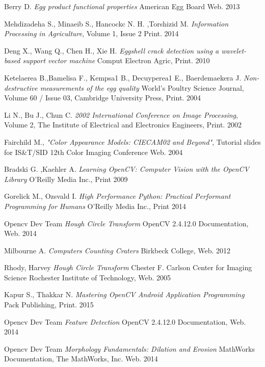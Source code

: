 \documentclass[12pt,twoside,a4paper]{article}
\begin{document}
\begin{thebibliography}{9}
 
Berry D.
\textit{Egg product functional properties} 
American Egg Board Web. 2013

Mehdizadeha S., Minaeib S., Hancockc N. H. ,Torshizid M.
\textit{Information Processing in Agriculture}, Volume 1, Issue 2 
Print. 2014

Deng X., Wang Q., Chen H., Xie H.
\textit{Eggshell crack detection using a wavelet-based support vector machine} Comput Electron Agric, Print. 2010

Ketelaerea B.,Bamelisa F., Kempsa1 B., Decuyperea1 E., Baerdemaekera J.
\textit{Non-destructive measurements of the egg quality} World's Poultry Science Journal, Volume 60 / Issue 03,  Cambridge University Press, Print. 2004
 

Li N., Bu J., Chun C. 
\textit{2002 International Conference on Image Processing}, Volume 2, The Institute of Electrical and Electronics Engineers, Print. 2002

Fairchild M., 
\textit{"Color Appearance Models: CIECAM02 and Beyond"}, Tutorial slides for IS\&T/SID 12th Color Imaging Conference Web. 2004
 
Bradski G. ,Kaehler A.
\textit{Learning OpenCV: Computer Vision with the OpenCV Library} O'Reilly Media Inc., Print 2009


Gorelick M., Ozsvald I.
\textit{High Performance Python: Practical Performant Programming for Humans} O'Reilly Media Inc., Print 2014

Opencv Dev Team
\textit{Hough Circle Transform} OpenCV 2.4.12.0 Documentation, Web. 2014

Milbourne A.
\textit{Computers Counting Craters} Birkbeck College, Web. 2012

Rhody, Harvey
\textit{Hough Circle Transform} Chester F. Carlson Center for Imaging Science Rochester Institute of Technology, Web. 2005

Kapur S., Thakkar N.
\textit{Mastering OpenCV Android Application Programming} Pack Publishing, Print. 2015

Opencv Dev Team
\textit{Feature Detection} OpenCV 2.4.12.0 Documentation, Web. 2014

Opencv Dev Team
\textit{Morphology Fundamentals: Dilation and Erosion} MathWorks Documentation, The MathWorks, Inc. Web. 2014


\end{thebibliography}
\end{document}
